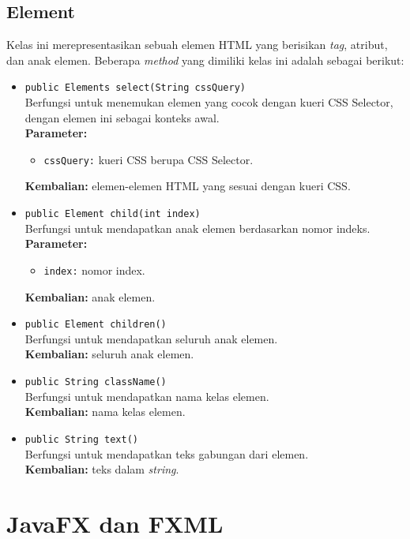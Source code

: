 \subsection{Element}
Kelas ini merepresentasikan sebuah elemen HTML yang berisikan \textit{tag}, atribut, dan anak elemen. Beberapa \textit{method} yang dimiliki kelas ini adalah sebagai berikut:
\begin{itemize}
    	\item \texttt{public Elements select(String cssQuery)} \\
		Berfungsi untuk menemukan elemen yang cocok dengan kueri CSS Selector, dengan elemen ini sebagai konteks awal. \\
		\textbf{Parameter:} 
		\begin{itemize}
			\item \texttt{cssQuery:} kueri CSS berupa CSS Selector.
		\end{itemize}
		\textbf{Kembalian:} elemen-elemen HTML yang sesuai dengan kueri CSS.	

    	\item \texttt{public Element child(int index)} \\
		Berfungsi untuk mendapatkan anak elemen berdasarkan nomor indeks. \\
		\textbf{Parameter:} 
		\begin{itemize}
			\item \texttt{index:} nomor index.
		\end{itemize}
		\textbf{Kembalian:} anak elemen.	
		
		\item \texttt{public Element children()} \\
		Berfungsi untuk mendapatkan seluruh anak elemen. \\
		\textbf{Kembalian:} seluruh anak elemen.	
		
		\item \texttt{public String className()} \\
		Berfungsi untuk mendapatkan nama kelas elemen. \\
		\textbf{Kembalian:} nama kelas elemen.	
		
		\item \texttt{public String text()} \\
		Berfungsi untuk mendapatkan teks gabungan dari elemen. \\
		\textbf{Kembalian:} teks dalam \textit{string}.	
\end{itemize}

\section{JavaFX dan FXML}
\label{sec:javafxfxml}

